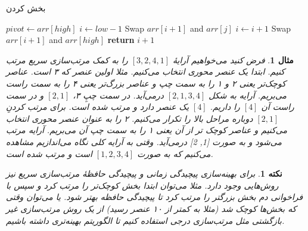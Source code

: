 \documentclass[12pt]{article}
\newtheorem{remark}{نکته}
\newtheorem{example}{مثال}
\begin{document}
\begin{algorithm}[H]
  \caption{بخش کردن}
  \label{alg:a6}
  \begin{latin}
    \begin{algorithmic}[1]
      \State $pivot \gets arr[high]$
      \State $i \gets low - 1$
      \State Swap $arr[i+1]$ and $arr[j]$
      \State $i \gets i + 1$
      \EndIf
      \EndFor
      \State Swap $arr[i+1]$ and $arr[high]$
      \State \textbf{return} $i+1$
      \EndProcedure
    \end{algorithmic}
  \end{latin}
\end{algorithm}

\begin{example}
  فرض کنید می‌خواهیم آرایهٔ $[3, 2, 4, 1]$
  را به کمک مرتب‌سازی سریع مرتب کنیم.
  ابتدا یک عنصر محوری انتخاب می‌کنیم.
  مثلا اولین عنصر که ۳ است.
  عناصر کوچک‌تر یعنی ۲ و ۱ را به سمت چپ و
  عناصر بزرگ‌تر یعنی ۴ را به سمت راست می‌بریم.
  آرایه به شکل
  $[2,1,3,4]$
  درمی‌آید.
  در سمت چپِ ۳،
  $[2, 1]$
  و در سمت راست آن $[4]$
  را داریم.
  $[4]$
  یک عنصر دارد و مرتب شده است.
  برای مرتب کردنِ
  $[2, 1]$
  دوباره مراحل بالا را تکرار می‌کنیم.
  ۲
  را به عنوان عنصر محوری انتخاب می‌کنیم و
  عناصر کوچک تر از آن یعنی ۱ را به سمت چپ آن می‌بریم.
  آرایه مرتب می‌شود و به صورت
  [1, 2]
  درمی‌آید.
  وقتی به آرایه کلی نگاه می‌اندازیم مشاهده می‌کنیم که به صورت
  $[1, 2, 3, 4]$
  است و مرتب شده است.
\end{example}

\begin{remark}
  برای بهینه‌سازی پیچیدگی زمانی و پیچیدگی حافظهٔ مرتب‌سازی سریع نیز روش‌هایی وجود دارد.
  مثلا می‌توان ابتدا بخش کوچک‌تر را مرتب کرد و سپس با فراخوانی دم
  بخش بزرگتر را مرتب کرد تا
  پیچیدگی حافظه بهتر شود.
  یا می‌توان وقتی که بخش‌ها کوچک شد
  (مثلا به کمتر از ۱۰ عنصر رسید)
  از یک روش مرتب‌سازی غیر بازگشتی
  مثل مرتب‌سازی درجی استفاده کنیم
  تا الگوریتم بهینه‌تری داشته باشیم.\cite{quick3}\cite{quick4}
\end{remark}

\pagebreak

{
  \fontsize{12pt}{10pt}\selectfont
  
  
}
\end{document}
